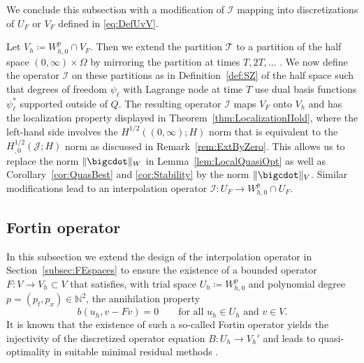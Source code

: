\documentclass{amsart}
\providecommand{\tria}{\mathcal{T}}
\newcommand{\cJ}{\mathcal J}
\begin{document}
%
We conclude this subsection with a modification of $\mathcal{I}$ mapping into discretizations of $U_F$ or $V_F$ defined in \eqref{eq:DefUvV}.
\begin{remark}\label{rem:IforUandV}
Let $V_h \coloneqq  W^p_{h,0} \cap V_F$. Then we extend the partition $\tria$ to a partition of the half space $(0,\infty) \times \Omega$ by mirroring the partition at times $T, 2T,\dots$ . We now define the operator $\mathcal{I}$ on these partitions as in Definition~\ref{def:SZ} of the half space such that degrees of freedom $\psi_\ell$ with Lagrange node at time $T$ use dual basis functions $\psi_\ell^*$ supported outside of $Q$. The resulting operator $\mathcal{I}$ maps $V_F$ onto $V_h$ and has the localization property displayed in Theorem~\ref{thm:LocalizationIIold}, where the left-hand side involves the $H^{1/2}((0,\infty);H)$ norm that is equivalent to the $H^{1/2}_{,0}(\cJ;H)$ norm as discussed in Remark~\ref{rem:ExtByZero}.
This allows us to replace the norm $\lVert \bigcdot \rVert_W$ in Lemma~\ref{lem:LocalQuasiOpt} as well as Corollary~\ref{cor:QuasBest} and \ref{cor:Stability} by the norm $\lVert \bigcdot \rVert_V$.
Similar modifications lead to an interpolation operator $\mathcal{I} \colon U_F \to W^p_{h,0}\cap U_F$.
\end{remark}
%
\subsection{Fortin operator}\label{subsec:Fortin}
%
In this subsection we extend the design of the interpolation operator in Section~\ref{subsec:FEspaces} to ensure the existence of a bounded operator $F\colon V \to V_h \subset V$ that satisfies, with trial space $U_h \coloneqq W_{h,0}^p$ and polynomial degree $p = (p_t,p_x)\in \mathbb{N}^2$, the annihilation property
\begin{equation*}
b(u_h,v-F v) = 0\qquad\text{for all }u_h \in U_h\text{ and }v\in V.
\end{equation*}
It is known that the existence of such a so-called Fortin operator yields the injectivity of the discretized operator equation $B\colon U_h \to V_h'$ \cite{Fortin77} and leads to quasi-optimality in suitable minimal residual methods \cite[Thm.~3.6]{MonsuurStevensonStorn23}. 
\end{document}
